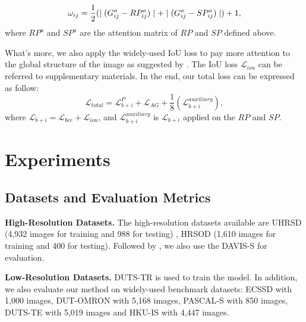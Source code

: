 \documentclass[10pt,twocolumn,letterpaper]{article}
\begin{document}
\begin{equation}\small
    \omega_{ij} = \frac{1}{2}(\mid(G^a_{ij}-RP^a_{ij})\mid +\mid(G^a_{ij}-SP^a_{ij})\mid)+1    ,
    \label{eq:omega}
\end{equation}
where $RP^a$ and $SP^a$ are the attention matrix of $RP$ and $SP$ defined above.

What's more, we also apply the widely-used IoU loss \cite{mattyus2017deeproadmapper} to pay more attention to the global structure of the image as suggested by \cite{qin2019basnet}. The IoU loss $\mathcal{L}_{iou}$ can be referred to supplementary materials.
In the end, our total loss can be expressed as follow:
\begin{equation}
    \mathcal{L}_{total} = \mathcal{L}_{b+ i}^{P}+\mathcal{L}_{AG}+\frac{1}{8}(\mathcal{L}_{b+ i}^{auxiliary}),
    \label{eq:total}
\end{equation}
where $\mathcal{L}_{b+i}=\mathcal{L}_{bce}+\mathcal{L}_{iou}$, and $\mathcal{L}^{auxiliary}_{b+i}$ is $\mathcal{L}_{b+i}$ applied on the $RP$ and $SP$.

\label{subsec:agl}
\section{Experiments}

\subsection{Datasets and Evaluation Metrics}

\textbf{High-Resolution Datasets.} 
The high-resolution datasets available are UHRSD (4,932 images for training and 988 for testing) , HRSOD\cite{zeng2019towards} (1,610 images for training and 400 for testing). Followed by \cite{zeng2019towards,tang2021disentangled}, we also use the DAVIS-S for evaluation. 

\textbf{Low-Resolution Datasets.} 
DUTS-TR \cite{wang2017learning} is used to train the model. In addition, we also evaluate our method on widely-used benchmark datasets: ECSSD \cite{yan2013hierarchical} with 1,000 images, DUT-OMRON \cite{yang2013saliency} with 5,168 images, PASCAL-S\cite{li2014secrets} with 850 images, DUTS-TE \cite{wang2017learning} with 5,019 images and HKU-IS\cite{li2015visual} with 4,447 images.
\end{document}
